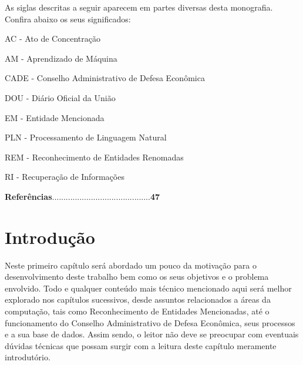 \documentclass[11pt]{report}
\begin{document}
\indent\indent As siglas descritas a seguir aparecem em partes diversas desta monografia. Confira abaixo
os seus significados:

\vspace*{20px}

\noindent AC - Ato de Concentração

\vspace*{8px}
\noindent AM - Aprendizado de Máquina

\vspace*{8px}
\noindent CADE - Conselho Administrativo de Defesa Econômica

\vspace*{8px}
\noindent DOU - Diário Oficial da União

\vspace*{8px}
\noindent EM - Entidade Mencionada

\vspace*{8px}
\noindent PLN - Processamento de Linguagem Natural

\vspace*{8px}
\noindent REM - Reconhecimento de Entidades Renomadas

\vspace*{8px}
\noindent RI - Recuperação de Informações

\pagebreak
\thispagestyle{empty}

\tableofcontents

\vspace*{10px}

\hspace*{-0.7cm}
\textbf{Referências}\thinspace\enspace.\enspace.\enspace.\enspace.\enspace.\enspace.\enspace.\enspace.\enspace.\enspace.\enspace.\enspace.\enspace.\enspace.\enspace.\enspace.\enspace.\enspace.\enspace.\enspace.\enspace.\enspace.\enspace.\enspace.\enspace.\enspace.\enspace.\enspace.\enspace.\enspace.\enspace.\enspace.\enspace.\enspace.\enspace.\enspace.\enspace.\enspace.\enspace.\enspace.\enspace.\enspace.\enspace.\thinspace\thinspace\enspace\textbf{47}

\pagebreak
\chapter{Introdução}
\indent\indent Neste primeiro capítulo será abordado um pouco da motivação para o desenvolvimento deste trabalho bem como os seus objetivos e o problema envolvido.
Todo e qualquer conteúdo mais técnico mencionado aqui será melhor explorado nos capítulos sucessivos, desde assuntos relacionados a áreas da computação, tais como
Reconhecimento de Entidades Mencionadas, até o funcionamento do Conselho Administrativo de Defesa Econômica, seus processos e a sua base de dados. Assim sendo, o
leitor não deve se preocupar com eventuais dúvidas técnicas que possam surgir com a leitura deste capítulo meramente introdutório.
\end{document}
